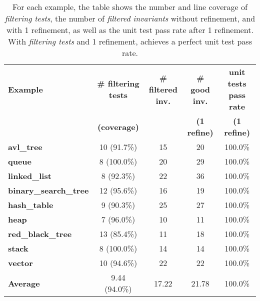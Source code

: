 \begin{table}[ht]
\centering
\small
\begin{tabular}{|l|c|c|c|c|}
\hline
\textbf{Example}            & \textbf{\# filtering tests} & \textbf{\# filtered inv.} & \textbf{\# good inv.} & \textbf{unit tests pass rate} \\ 
&\textbf{(coverage)}&&\textbf{(1 refine)}&\textbf{(1 refine)}  \\ \hline
\textbf{avl\_tree}           & 10 (91.7\%)           & 15                           & 20                        & 100.0\% \\ \hline
\textbf{queue}               & 8 (100.0\%)           & 20                           & 29                        & 100.0\% \\ \hline
\textbf{linked\_list}        & 8 (92.3\%)            & 22                           & 36                        & 100.0\% \\ \hline
\textbf{binary\_search\_tree} & 12 (95.6\%)          & 16                           & 19                        & 100.0\% \\ \hline
\textbf{hash\_table}         & 9 (90.3\%)            & 25                           & 27                        & 100.0\% \\ \hline
\textbf{heap}                & 7 (96.0\%)            & 10                           & 11                        & 100.0\% \\ \hline
\textbf{red\_black\_tree}    & 13 (85.4\%)           & 11                           & 18                        & 100.0\% \\ \hline
\textbf{stack}               & 8 (100.0\%)           & 14                           & 14                        & 100.0\% \\ \hline
\textbf{vector}              & 10 (94.6\%)           & 22                           & 22                        & 100.0\% \\ \hline
\textbf{Average}             & 9.44 (94.0\%)         & 17.22                        & 21.78                     & 100.0\% \\ \hline
\end{tabular}
\caption{For each example, the table shows the number and line coverage of \textit{filtering tests}, the number of \textit{filtered invariants} without refinement, and with 1 refinement, as well as the unit test pass rate after 1 refinement. With \textit{filtering tests} and 1 refinement, \tech achieves a perfect unit test pass rate.}
\label{ds_refine}
\end{table}
